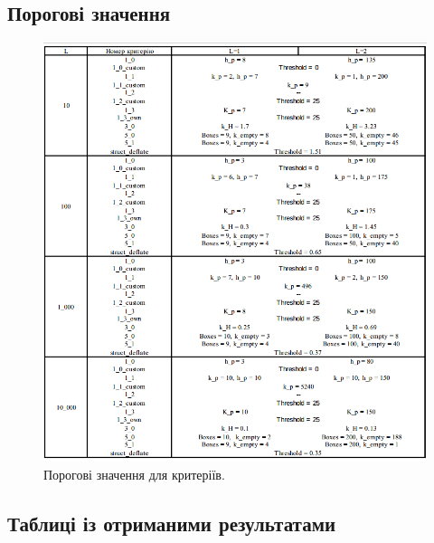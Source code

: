 \subsection{Порогові значення}
\begin{figure}[!h]
    		\centering
    		\includegraphics[scale = 0.55]{Images/parameters.png}
    		\caption{Порогові значення для критеріїв.}
    		\label{fig:threshold_values}
	\end{figure}

\subsection{Таблиці із отриманими результатами}

